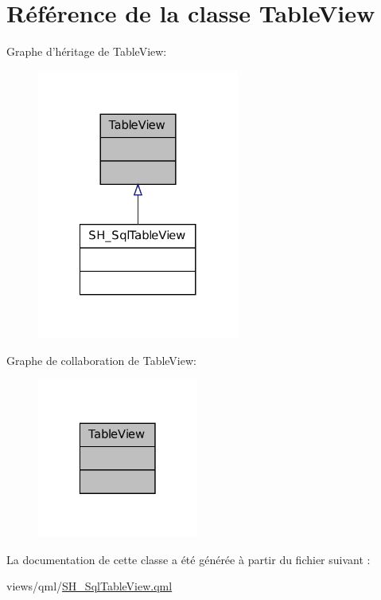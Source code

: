 \hypertarget{classTableView}{\section{Référence de la classe Table\-View}
\label{classTableView}
}


Graphe d'héritage de Table\-View\-:
\nopagebreak
\begin{figure}[H]
\begin{center}
\leavevmode
\includegraphics[width=188pt]{classTableView__inherit__graph}
\end{center}
\end{figure}


Graphe de collaboration de Table\-View\-:
\nopagebreak
\begin{figure}[H]
\begin{center}
\leavevmode
\includegraphics[width=150pt]{classTableView__coll__graph}
\end{center}
\end{figure}


La documentation de cette classe a été générée à partir du fichier suivant \-:\begin{DoxyCompactItemize}
\item 
views/qml/\hyperlink{SH__SqlTableView_8qml}{S\-H\-\_\-\-Sql\-Table\-View.\-qml}\end{DoxyCompactItemize}
